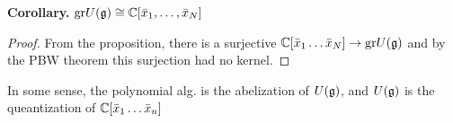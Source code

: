\documentclass[]{../../../../tex/classes/styledArticle}
\newcommand\g  {\mathfrak{g}}
\begin{document}
	\textbf{Corollary. }$\gr\UU(\g) \cong \C[\bar x_1, \dots, \bar x_N]$
	
	\begin{proof}
		From the proposition, there is a surjective $\C[\bar x_1 \dots \bar x_N] \to \gr\UU(\g)$ and by the PBW theorem this surjection had no kernel. 
	\end{proof}
	
	In some sense, the polynomial alg. is the abelization of $\UU(\g)$, and $\UU(\g)$ is the queantization of $\mathbb{C}[\bar x_1 \dots \bar x_n]$
	
	
	
	
	
	
	
	
	
	
\end{document}
